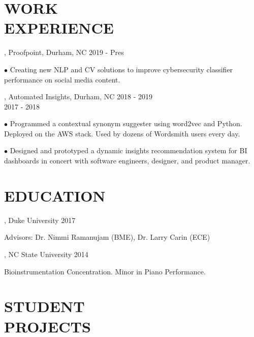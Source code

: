 \documentclass[resmargin, 11pt]{resume_style_class} %
\newenvironment{outline}
  {\begin{list}{}{\setlength{\leftmargin}{30pt}\setlength\itemsep{-2pt}}}
  {\end{list}}
\begin{document}
\begin{resume}

 
\section{WORK \\ EXPERIENCE}
, Proofpoint, Durham, NC \hfill 2019 - Pres
\begin{outline}
	\item[$\bullet$\hspace{0.1cm}] Creating new NLP and CV solutions to improve cybersecurity classifier performance on social media content.
\end{outline} 

, Automated Insights, Durham, NC \hfill 2018 - 2019 \\
 \hfill 2017 - 2018
\begin{outline}
	\item[$\bullet$\hspace{0.1cm}] Programmed a contextual synonym suggester using word2vec and Python. Deployed on the AWS stack. Used by dozens of Wordsmith users every day.
	\item[$\bullet$\hspace{0.1cm}] Designed and prototyped a dynamic insights recommendation system for BI dashboards in concert with software engineers, designer, and product manager.
\end{outline} 

\section{EDUCATION}

, Duke University \hfill 2017
\begin{outline}
	\item Advisors: Dr. Nimmi Ramanujam (BME), Dr. Larry Carin (ECE)
\end{outline}

, NC State University \hfill 2014
\begin{outline}
	\item Bioinstrumentation Concentration. Minor in Piano Performance.
\end{outline}

\section{STUDENT \\ PROJECTS}


\end{resume}
\end{document}
